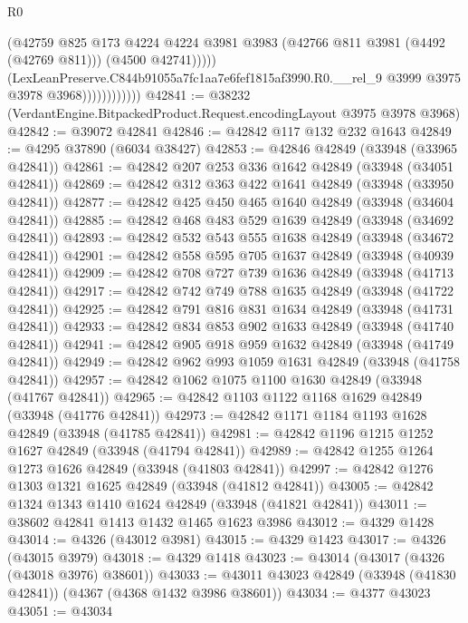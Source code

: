 \begin{lexlean}{R0}
\begin{coremodule}
                                (@42759
                                  @825
                                  @173
                                  @4224
                                  @4224
                                  @3981
                                  @3983
                                  (@42766 @811 @3981 (@4492 (@42769 @811)))
                                  (@4500 @42741)))))
                          (LexLeanPreserve.C844b91055a7fc1aa7e6fef1815af3990.R0.__rel_9
                            @3999
                            @3975
                            @3978
                            @3968))))))))))))
@42841 := @38232 (VerdantEngine.BitpackedProduct.Request.encodingLayout @3975 @3978 @3968)
@42842 := @39072 @42841
@42846 := @42842 @117 @132 @232 @1643
@42849 := @4295 @37890 (@6034 @38427)
@42853 := @42846 @42849 (@33948 (@33965 @42841))
@42861 := @42842 @207 @253 @336 @1642 @42849 (@33948 (@34051 @42841))
@42869 := @42842 @312 @363 @422 @1641 @42849 (@33948 (@33950 @42841))
@42877 := @42842 @425 @450 @465 @1640 @42849 (@33948 (@34604 @42841))
@42885 := @42842 @468 @483 @529 @1639 @42849 (@33948 (@34692 @42841))
@42893 := @42842 @532 @543 @555 @1638 @42849 (@33948 (@34672 @42841))
@42901 := @42842 @558 @595 @705 @1637 @42849 (@33948 (@40939 @42841))
@42909 := @42842 @708 @727 @739 @1636 @42849 (@33948 (@41713 @42841))
@42917 := @42842 @742 @749 @788 @1635 @42849 (@33948 (@41722 @42841))
@42925 := @42842 @791 @816 @831 @1634 @42849 (@33948 (@41731 @42841))
@42933 := @42842 @834 @853 @902 @1633 @42849 (@33948 (@41740 @42841))
@42941 := @42842 @905 @918 @959 @1632 @42849 (@33948 (@41749 @42841))
@42949 := @42842 @962 @993 @1059 @1631 @42849 (@33948 (@41758 @42841))
@42957 := @42842 @1062 @1075 @1100 @1630 @42849 (@33948 (@41767 @42841))
@42965 := @42842 @1103 @1122 @1168 @1629 @42849 (@33948 (@41776 @42841))
@42973 := @42842 @1171 @1184 @1193 @1628 @42849 (@33948 (@41785 @42841))
@42981 := @42842 @1196 @1215 @1252 @1627 @42849 (@33948 (@41794 @42841))
@42989 := @42842 @1255 @1264 @1273 @1626 @42849 (@33948 (@41803 @42841))
@42997 := @42842 @1276 @1303 @1321 @1625 @42849 (@33948 (@41812 @42841))
@43005 := @42842 @1324 @1343 @1410 @1624 @42849 (@33948 (@41821 @42841))
@43011 := @38602 @42841 @1413 @1432 @1465 @1623 @3986
@43012 := @4329 @1428
@43014 := @4326 (@43012 @3981)
@43015 := @4329 @1423
@43017 := @4326 (@43015 @3979)
@43018 := @4329 @1418
@43023 := @43014 (@43017 (@4326 (@43018 @3976) @38601))
@43033 := @43011 @43023 @42849 (@33948 (@41830 @42841)) (@4367 (@4368 @1432 @3986 @38601))
@43034 := @4377 @43023
@43051 := @43034

\end{coremodule}
\end{lexlean}

